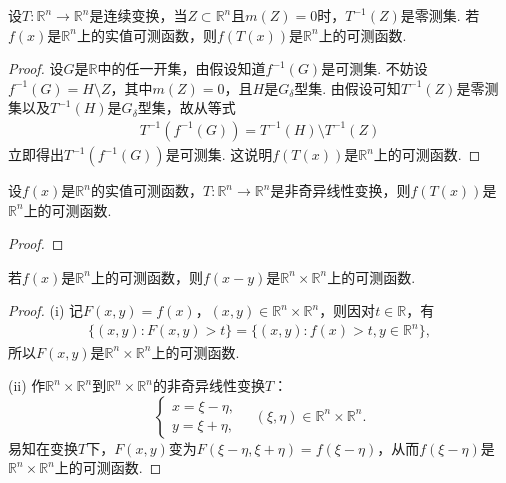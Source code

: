 \documentclass[../../main.tex]{subfiles}%
\begin{document}
\begin{theorem}
设\(T: \mathbb{R}^{n} \to \mathbb{R}^{n}\)是连续变换，当\(Z \subset \mathbb{R}^{n}\)且\(m(Z) = 0\)时，\(T^{-1}(Z)\)是零测集. 若\(f(x)\)是\(\mathbb{R}^{n}\)上的实值可测函数，则\(f(T(x))\)是\(\mathbb{R}^{n}\)上的可测函数.
\end{theorem}
\begin{proof}
设\(G\)是\(\mathbb{R}\)中的任一开集，由假设知道\(f^{-1}(G)\)是可测集. 不妨设\(f^{-1}(G) = H \setminus Z\)，其中\(m(Z) = 0\)，且\(H\)是\(G_{\delta}\)型集. 由假设可知\(T^{-1}(Z)\)是零测集以及\(T^{-1}(H)\)是\(G_{\delta}\)型集，故从等式
\begin{align*}
T^{-1}(f^{-1}(G)) = T^{-1}(H) \setminus T^{-1}(Z)
\end{align*}
立即得出\(T^{-1}(f^{-1}(G))\)是可测集. 这说明\(f(T(x))\)是\(\mathbb{R}^{n}\)上的可测函数.
\end{proof}

\begin{corollary}
设\(f(x)\)是\(\mathbb{R}^{n}\)的实值可测函数，\(T: \mathbb{R}^{n} \to \mathbb{R}^{n}\)是非奇异线性变换，则\(f(T(x))\)是\(\mathbb{R}^{n}\)上的可测函数.
\end{corollary}
\begin{proof}

\end{proof}

\begin{example}
若\(f(x)\)是\(\mathbb{R}^{n}\)上的可测函数，则\(f(x - y)\)是\(\mathbb{R}^{n} \times \mathbb{R}^{n}\)上的可测函数.
\end{example}
\begin{proof}
(i) 记\(F(x, y) = f(x)\)，\((x, y) \in \mathbb{R}^{n} \times \mathbb{R}^{n}\)，则因对\(t \in \mathbb{R}\)，有
\begin{align*}
\{(x, y): F(x, y) > t\} = \{(x, y): f(x) > t, y \in \mathbb{R}^{n}\},
\end{align*}
所以\(F(x, y)\)是\(\mathbb{R}^{n} \times \mathbb{R}^{n}\)上的可测函数.

(ii) 作\(\mathbb{R}^{n} \times \mathbb{R}^{n}\)到\(\mathbb{R}^{n} \times \mathbb{R}^{n}\)的非奇异线性变换\(T\)：
\[
\begin{cases}
x = \xi - \eta, \\
y = \xi + \eta,
\end{cases}
\quad (\xi, \eta) \in \mathbb{R}^{n} \times \mathbb{R}^{n}.
\]
易知在变换\(T\)下，\(F(x, y)\)变为\(F(\xi - \eta, \xi + \eta) = f(\xi - \eta)\)，从而\(f(\xi - \eta)\)是\(\mathbb{R}^{n} \times \mathbb{R}^{n}\)上的可测函数.
\end{proof}
\end{document}
